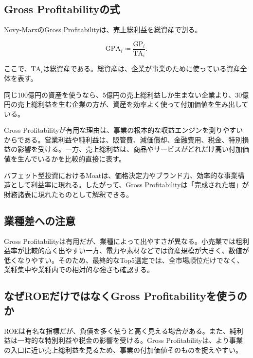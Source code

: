 \documentclass[11pt,a4paper]{article}
\newcommand{\TA}{\mathrm{TA}}
\newcommand{\GP}{\mathrm{GP}}
\begin{document}
\subsection{Gross Profitabilityの式}

Novy-MarxのGross Profitabilityは、売上総利益を総資産で割る。

\begin{equation}
\mathrm{GPA}_i \coloneqq \frac{\GP_i}{\TA_i}.
\label{eq:gpa}
\end{equation}

ここで、$\TA_i$は総資産である。総資産は、企業が事業のために使っている資産全体を表す。

\begin{defbox}[直感]
同じ100億円の資産を使うなら、5億円の売上総利益しか生まない企業より、30億円の売上総利益を生む企業の方が、資産を効率よく使って付加価値を生み出している。
\end{defbox}

Gross Profitabilityが有用な理由は、事業の根本的な収益エンジンを測りやすいからである。営業利益や純利益は、販管費、減価償却、金融費用、税金、特別損益の影響を受ける。一方、売上総利益は、商品やサービスがどれだけ高い付加価値を生んでいるかを比較的直接に表す。

バフェット型投資におけるMoatは、価格決定力やブランド力、効率的な事業構造として利益率に現れる。したがって、Gross Profitabilityは「完成された堀」が財務諸表に現れたものとして解釈できる。

\subsection{業種差への注意}

Gross Profitabilityは有用だが、業種によって出やすさが異なる。小売業では粗利益率が比較的高く出やすい一方、電力や素材などでは資産規模が大きく、数値が低くなりやすい。そのため、最終的なTop5選定では、全市場順位だけでなく、業種集中や業種内での相対的な強さも確認する。

\subsection{なぜROEだけではなくGross Profitabilityを使うのか}

ROEは有名な指標だが、負債を多く使うと高く見える場合がある。また、純利益は一時的な特別利益や税金の影響を受ける。Gross Profitabilityは、より事業の入口に近い売上総利益を見るため、事業の付加価値そのものを捉えやすい。
\end{document}
